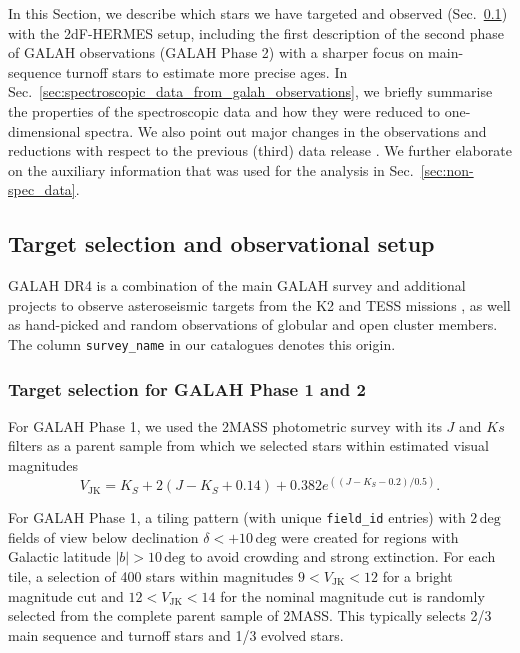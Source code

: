 \documentclass[
  journal=pasa,
  manuscript=research-paper, %
  year=2023,
  volume=37
]{cup-journal}
\begin{document}
In this Section, we describe which stars we have targeted and observed (Sec.~\ref{sec:target_selection_observations}) with the 2dF-HERMES setup, including the first description of the second phase of GALAH observations (GALAH Phase 2) with a sharper focus on main-sequence turnoff stars to estimate more precise ages. In Sec.~\ref{sec:spectroscopic_data_from_galah_observations}, we briefly summarise the properties of the spectroscopic data and how they were reduced to one-dimensional spectra. We also point out major changes in the observations and reductions with respect to the previous (third) data release \citep{Buder2021}. We further elaborate on the auxiliary information that was used for the analysis in Sec.~\ref{sec:non-spec_data}.

\subsection{Target selection and observational setup} \label{sec:target_selection_observations}

GALAH DR4 is a combination of the main GALAH survey and additional projects to observe asteroseismic targets from the K2 \cite{Sharma2019} and TESS missions \cite{Sharma2018}, as well as hand-picked and random observations of globular and open cluster members. The column \texttt{survey\_name} in our catalogues denotes this origin.

\subsubsection{Target selection for GALAH Phase 1 and 2}

For GALAH Phase 1, we used the 2MASS photometric survey \citep{Skrutskie2006} with its $J$ and $Ks$ filters as a parent sample from which we selected stars within estimated visual magnitudes
\begin{equation}
V_\mathrm{JK} = K_S+2(J-K_S+0.14)+0.382e^{((J-K_S-0.2)/0.5)}.
\end{equation}

For GALAH Phase 1, a tiling pattern (with unique \texttt{field\_id} entries) with $2\,\mathrm{deg}$ fields of view below declination $\delta < +10\,\mathrm{deg}$ were created for regions with Galactic latitude $\vert b \vert > 10\,\mathrm{deg}$ to avoid crowding and strong extinction. For each tile, a selection of 400 stars within magnitudes $9 < V_\mathrm{JK} < 12$ for a bright magnitude cut and $12 < V_\mathrm{JK} < 14$ for the nominal magnitude cut is randomly selected from the complete parent sample of 2MASS. This typically selects 2/3 main sequence and turnoff stars and 1/3 evolved stars.
\end{document}
